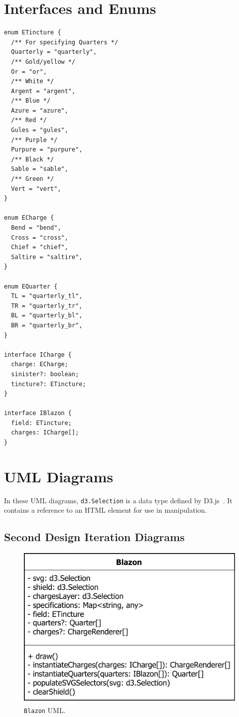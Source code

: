 \graphicspath{{graphics/}} %

\appendix
{}

\chapter{Interfaces and Enums}%
\label{cha:interfaces_and_enums}

\begin{verbatim}
enum ETincture {
  /** For specifying Quarters */
  Quarterly = "quarterly",
  /** Gold/yellow */
  Or = "or",
  /** White */
  Argent = "argent",
  /** Blue */
  Azure = "azure",
  /** Red */
  Gules = "gules",
  /** Purple */
  Purpure = "purpure",
  /** Black */
  Sable = "sable",
  /** Green */
  Vert = "vert",
}

enum ECharge {
  Bend = "bend",
  Cross = "cross",
  Chief = "chief",
  Saltire = "saltire",
}

enum EQuarter {
  TL = "quarterly_tl",
  TR = "quarterly_tr",
  BL = "quarterly_bl",
  BR = "quarterly_br",
}

interface ICharge {
  charge: ECharge;
  sinister?: boolean;
  tincture?: ETincture;
}

interface IBlazon {
  field: ETincture;
  charges: ICharge[];
}
\end{verbatim}

\chapter{UML Diagrams}%
\label{cha:uml_diagrams}

In these UML diagrams, \texttt{d3.Selection} is a data type defined by D3.js~\autocite{d3js}. It
contains a reference to an HTML element for use in \dom{} manipulation.

\section{Second Design Iteration Diagrams}%
\label{sec:second_design_iteration_diagrams}

\begin{figure}[h]
  \includegraphics[width=0.5\linewidth]{BlazonUML}
  \caption{\texttt{Blazon} UML.}%
  \label{fig:BlazonUML}
\end{figure}

